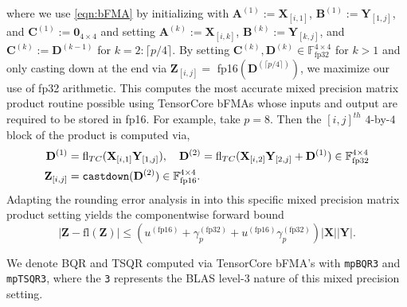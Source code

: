 \documentclass[review,onefignum,onetabnum]{siamart190516}
\newcommand{\F}{\mathbb{F}}
\newcommand{\bb}[1]{\mathbf{#1}}
\newcommand{\fl}{\mathrm{fl}}
\begin{document}
where we use \cref{eqn:bFMA} by initializing with $\bb{A}^{(1)}:= \bb{X}_{[i,1]}$, $\bb{B}^{(1)}:= \bb{Y}_{[1,j]}$, and $\bb{C}^{(1)}:= \bb{0}_{4\times 4}$ and setting $\bb{A}^{(k)}:= \bb{X}_{[i,k]}$, $\bb{B}^{(k)}:= \bb{Y}_{[k,j]}$, and $\bb{C}^{(k)}:= \bb{D}^{(k-1)}$ for $k=2:\lceil p/4\rceil$.
By setting $\bb{C}^{(k)}, \bb{D}^{(k)}\in\F_{\text{fp32}}^{4\times 4}$ for $k>1$ and only casting down at the end via $\bb{Z}_{[i,j]} =$ fp16$(\bb{D}^{(\lceil p/4\rceil)})$, we maximize our use of fp32 arithmetic.
This computes the most accurate mixed precision matrix product routine possible using TensorCore bFMAs whose inputs and output are required to be stored in fp16.
For example, take $p=8$.
Then the $[i,j]^{th}$ $4$-by-$4$ block of the product is computed via,
\begin{align*}
\bb{D}^{(1)} &= \fl_{TC}(\bb{X}_{[i,1]} \bb{Y}_{[1,j]}),\quad\bb{D}^{(2)} = \fl_{TC}(\bb{X}_{[i,2]} \bb{Y}_{[2,j]} + \bb{D}^{(1)})\in\F_{\text{fp32}}^{4\times 4}\\
\bb{Z}_{[i,j]} &= \text{\tt castdown}(\bb{D}^{(2)})\in\F_{\text{fp16}}^{4\times 4}.
\end{align*}
Adapting the rounding error analysis in \cite{Blanchard2020} into this specific mixed precision matrix product setting yields the componentwise forward bound 
\begin{equation}
|\bb{Z}-\fl(\bb{Z})| \leq \left(u^{(\text{fp16})}+ \gamma_{p}^{(\text{fp32})}+u^{(\text{fp16})} \gamma_{p}^{(\text{fp32})}\right)|\bb{X}||\bb{Y}|.\label{eqn:bFMAerr}
\end{equation}

We denote BQR and TSQR computed via TensorCore bFMA's with {\tt mpBQR3} and {\tt mpTSQR3}, where the {\tt 3} represents the BLAS level-3 nature of this mixed precision setting.
\end{document}
